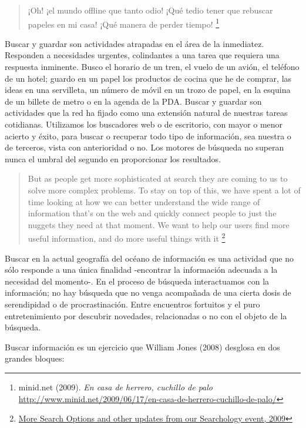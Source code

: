 \documentclass[12pt, a4paper,twoside]{book}
\begin{document}
\begin{quote}
¡Oh! ¡el mundo offline que tanto odio! ¡Qué tedio tener que
rebuscar papeles en mi casa! ¡Qué manera de perder tiempo!%
\footnote{minid.net (2009). \emph{En casa de herrero, cuchillo de palo}
\href{http://www.minid.net/2009/06/17/en-casa-de-herrero-cuchillo-de-palo/}{http://www.minid.net/2009/06/17/en-casa-de-herrero-cuchillo-de-palo/}}

\end{quote}
Buscar y guardar son actividades atrapadas en el área de la
inmediatez. Responden a necesidades urgentes, colindantes a una
tarea que requiera una respuesta inminente. Busco el horario de un
tren, el vuelo de un avión, el teléfono de un hotel; guardo en un
papel los productos de cocina que he de comprar, las ideas en una
servilleta, un número de móvil en un trozo de papel, en la esquina
de un billete de metro o en la agenda de la PDA. Buscar y guardar
son actividades que la red ha fijado como una extensión natural de
nuestras tareas cotidianas. Utilizamos los buscadores web o de
escritorio, con mayor o menor acierto y éxito, para buscar o
recuperar todo tipo de información, sea nuestra o de terceros,
vista con anterioridad o no. Los motores de búsqueda no superan
nunca el umbral del segundo en proporcionar los resultados.

\begin{quote}
But as people get more sophisticated at search they are coming to
us to solve more complex problems. To stay on top of this, we have
spent a lot of time looking at how we can better understand the
wide range of information that's on the web and quickly connect
people to just the nuggets they need at that moment. We want to
help our users find more useful information, and do more useful
things with it%
\footnote{\href{http://googleblog.blogspot.com/2009/05/more-search-options-and-other-updates.html}{More Search Options and other updates from our Searchology event, 2009}}

\end{quote}
Buscar en la actual geografía del océano de información es una
actividad que no sólo responde a una única finalidad -encontrar la
información adecuada a la necesidad del momento-. En el proceso de
búsqueda interactuamos con la información; no hay búsqueda que no
venga acompañada de una cierta dosis de serendipidad o de
procrastinación. Entre encuentros fortuitos y el puro
entretenimiento por descubrir novedades, relacionadas o no con el
objeto de la búsqueda.

Buscar información es un ejercicio que William Jones (2008)
desglosa en dos grandes bloques:
\end{document}
